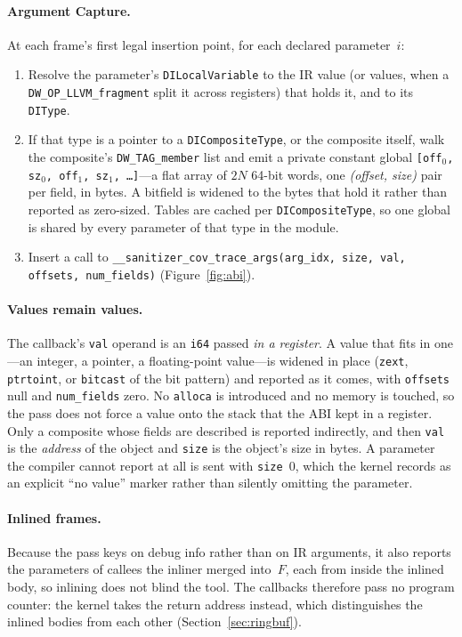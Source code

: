\documentclass{article}
\begin{document}
\paragraph{Argument Capture.} At each frame's first legal insertion point, for
each declared parameter~$i$:
\begin{enumerate}[nosep]
  \item Resolve the parameter's \texttt{DILocalVariable} to the IR value (or
        values, when a \texttt{DW\_OP\_LLVM\_fragment} split it across
        registers) that holds it, and to its \texttt{DIType}.
  \item If that type is a pointer to a \texttt{DICompositeType}, or the
        composite itself, walk the composite's \texttt{DW\_TAG\_member} list
        and emit a private constant global
        \texttt{[off$_0$, sz$_0$, off$_1$, sz$_1$, \ldots]}---a flat array of
        $2N$ 64-bit words, one \emph{(offset, size)} pair per field, in bytes.
        A bitfield is widened to the bytes that hold it rather than reported as
        zero-sized. Tables are cached per \texttt{DICompositeType}, so one
        global is shared by every parameter of that type in the module.
  \item Insert a call to
        \texttt{\_\_sanitizer\_cov\_trace\_args(arg\_idx, size, val,
        offsets, num\_fields)} (Figure~\ref{fig:abi}).
\end{enumerate}

\paragraph{Values remain values.} The callback's \texttt{val} operand is an
\texttt{i64} passed \emph{in a register}. A value that fits in one---an
integer, a pointer, a floating-point value---is widened in place
(\texttt{zext}, \texttt{ptrtoint}, or \texttt{bitcast} of the bit pattern) and
reported as it comes, with \texttt{offsets} null and \texttt{num\_fields}
zero. No \texttt{alloca} is introduced and no memory is touched, so the pass
does not force a value onto the stack that the ABI kept in a register. Only a
composite whose fields are described is reported indirectly, and then
\texttt{val} is the \emph{address} of the object and \texttt{size} is the
object's size in bytes. A parameter the compiler cannot report at all is sent
with \texttt{size}~0, which the kernel records as an explicit
``no value'' marker rather than silently omitting the parameter.

\paragraph{Inlined frames.} Because the pass keys on debug info rather than on
IR arguments, it also reports the parameters of callees the inliner merged
into~$F$, each from inside the inlined body, so inlining does not blind the
tool. The callbacks therefore pass no program counter: the kernel takes the
return address instead, which distinguishes the inlined bodies from each other
(Section~\ref{sec:ringbuf}).
\end{document}
